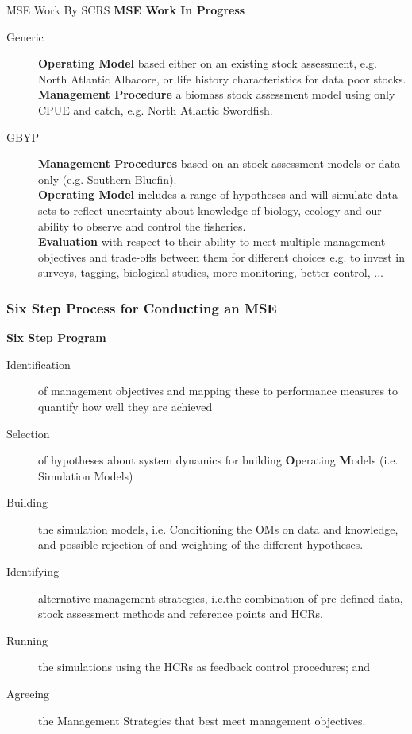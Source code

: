 \documentclass{beamer}
\newcommand\Fontviii{\fontsize{8}{10}\selectfont}
\begin{document}
\begin{frame}{MSE Work By SCRS}
   \smallskip\textbf{MSE Work In Progress}\smallskip\\
   \Fontviii
   \begin{description}%
       \item[Generic] \textbf{Operating Model} based either on an existing stock assessment,  e.g. North Atlantic Albacore, or life history characteristics for data poor stocks. \\ 
       \textbf{Management Procedure} a biomass stock assessment model using only CPUE and catch, e.g. North Atlantic Swordfish.
       \item[GBYP] \textbf{Management Procedures} based on an stock assessment models or data only (e.g. Southern Bluefin).\\
       \textbf{Operating Model} includes a range of hypotheses and will simulate data sets to reflect uncertainty about knowledge of biology, ecology and our ability to observe and control the fisheries. \\ 
       \textbf{Evaluation} with respect to their ability to meet multiple management objectives and trade-offs between them for different choices e.g.
       to invest in surveys, tagging, biological studies, more monitoring, better control, ...
    \end{description}
\end{frame}

\begin{frame}\frametitle{Six Step Process for Conducting an MSE} 
  \smallskip\textbf{Six Step Program}\smallskip
  \Fontviii
  \begin{description}%
    \item[Identification] of management objectives and mapping these to performance measures to quantify how well they are achieved\
    \item[Selection] of hypotheses about system dynamics for building \textbf{O}perating \textbf{M}odels (i.e. Simulation Models)
    \item[Building] the simulation models, i.e. Conditioning the OMs on data and knowledge, and possible rejection of and weighting of the different hypotheses.
    \item[Identifying] alternative management strategies, i.e.the combination of pre-defined data, stock assessment methods and reference points and HCRs.
    \item[Running] the simulations using the HCRs as feedback control procedures; and
    \item[Agreeing] the Management Strategies that best meet management objectives.
 \end{description}
 \end{frame}
\end{document}
